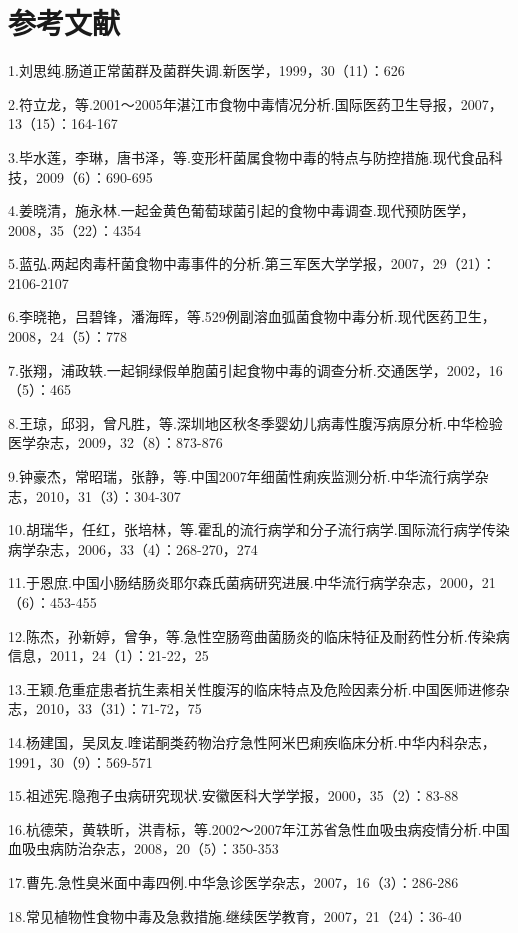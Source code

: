 \protect\hypertarget{text00188.html}{}{}

\section{参考文献}

1.刘思纯.肠道正常菌群及菌群失调.新医学，1999，30（11）：626

2.符立龙，等.2001～2005年湛江市食物中毒情况分析.国际医药卫生导报，2007，13（15）：164-167

3.毕水莲，李琳，唐书泽，等.变形杆菌属食物中毒的特点与防控措施.现代食品科技，2009（6）：690-695

4.姜晓清，施永林.一起金黄色葡萄球菌引起的食物中毒调查.现代预防医学，2008，35（22）：4354

5.蓝弘.两起肉毒杆菌食物中毒事件的分析.第三军医大学学报，2007，29（21）：2106-2107

6.李晓艳，吕碧锋，潘海晖，等.529例副溶血弧菌食物中毒分析.现代医药卫生，2008，24（5）：778

7.张翔，浦政轶.一起铜绿假单胞菌引起食物中毒的调查分析.交通医学，2002，16（5）：465

8.王琼，邱羽，曾凡胜，等.深圳地区秋冬季婴幼儿病毒性腹泻病原分析.中华检验医学杂志，2009，32（8）：873-876

9.钟豪杰，常昭瑞，张静，等.中国2007年细菌性痢疾监测分析.中华流行病学杂志，2010，31（3）：304-307

10.胡瑞华，任红，张培林，等.霍乱的流行病学和分子流行病学.国际流行病学传染病学杂志，2006，33（4）：268-270，274

11.于恩庶.中国小肠结肠炎耶尔森氏菌病研究进展.中华流行病学杂志，2000，21（6）：453-455

12.陈杰，孙新婷，曾争，等.急性空肠弯曲菌肠炎的临床特征及耐药性分析.传染病信息，2011，24（1）：21-22，25

13.王颖.危重症患者抗生素相关性腹泻的临床特点及危险因素分析.中国医师进修杂志，2010，33（31）：71-72，75

14.杨建国，吴凤友.喹诺酮类药物治疗急性阿米巴痢疾临床分析.中华内科杂志，1991，30（9）：569-571

15.祖述宪.隐孢子虫病研究现状.安徽医科大学学报，2000，35（2）：83-88

16.杭德荣，黄轶昕，洪青标，等.2002～2007年江苏省急性血吸虫病疫情分析.中国血吸虫病防治杂志，2008，20（5）：350-353

17.曹先.急性臭米面中毒四例.中华急诊医学杂志，2007，16（3）：286-286

18.常见植物性食物中毒及急救措施.继续医学教育，2007，21（24）：36-40

